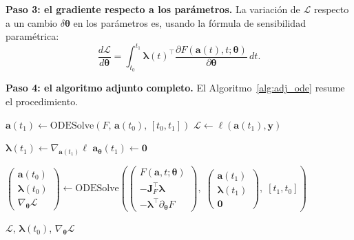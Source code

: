 \medskip
\noindent\textbf{Paso 3: el gradiente respecto a los parámetros.}
La variación de $\mathcal{L}$ respecto a un cambio $\delta\bm{\theta}$ en los
parámetros es, usando la fórmula de sensibilidad paramétrica:
\begin{equation}
  \frac{d\mathcal{L}}{d\bm{\theta}}
  = \int_{t_0}^{t_1}
  \bm{\lambda}(t)^\top
  \frac{\partial F(\bm{a}(t),t;\bm{\theta})}{\partial\bm{\theta}}\,dt.
  \label{eq:grad_theta}
\end{equation}

\medskip
\noindent\textbf{Paso 4: el algoritmo adjunto completo.}
El Algoritmo~\ref{alg:adj_ode} resume el procedimiento.

\begin{algorithm}[H]
\caption{Método adjunto para Neural ODEs}
\label{alg:adj_ode}

$\bm{a}(t_1) \leftarrow \mathrm{ODESolve}\!\left(F,\,\bm{a}(t_0),\,[t_0,t_1]\right)$\;
$\mathcal{L} \leftarrow \ell(\bm{a}(t_1),\bm{y})$\;

$\bm{\lambda}(t_1) \leftarrow \nabla_{\bm{a}(t_1)}\ell$\;
$\bm{a}_{\bm{\theta}}(t_1) \leftarrow \bm{0}$ 

$\begin{pmatrix}\bm{a}(t_0)\\\bm{\lambda}(t_0)\\\nabla_{\bm{\theta}}\mathcal{L}\end{pmatrix}
\leftarrow
\mathrm{ODESolve}\!\left(
  \begin{pmatrix}
    F(\bm{a},t;\bm{\theta})\\
    -\bm{J}_F^\top\bm{\lambda}\\
    -\bm{\lambda}^\top\partial_{\bm{\theta}}F
  \end{pmatrix},\;
  \begin{pmatrix}\bm{a}(t_1)\\\bm{\lambda}(t_1)\\\bm{0}\end{pmatrix},\;
  [t_1,t_0]\right)$\;

\Return $\mathcal{L}$, $\bm{\lambda}(t_0)$,
        $\nabla_{\bm{\theta}}\mathcal{L}$\;
\end{algorithm}

